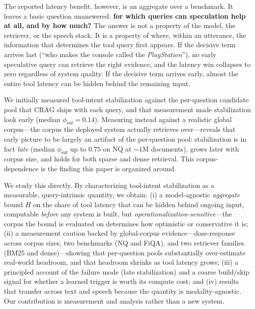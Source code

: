 \documentclass[11pt]{article}
\newcommand{\phiSufMed}{0.14}
\newcommand{\phiSufGnqOneM}{0.75}    %
\begin{document}
The reported latency benefit, however, is an aggregate over a benchmark. It
leaves a basic question unanswered: \textbf{for which queries can speculation
help at all, and by how much?} The answer is not a property of the model, the
retriever, or the speech stack. It is a property of where, within an utterance,
the information that determines the tool query first appears. If the
decisive term arrives last (``who makes the console called the
\emph{PlayStation}''), no early speculative query can retrieve the right evidence,
and the latency win collapses to zero regardless of system quality. If the
decisive term arrives early, almost the entire tool latency can be hidden behind
the remaining input.

We initially measured tool-intent stabilization against the per-question candidate
pool that CRAG ships with each query, and that measurement made stabilization look
early (median $\phi_{\mathrm{suf}}=\phiSufMed$).  Measuring instead against a
realistic global corpus---the corpus the deployed system actually retrieves
over---reveals that early picture to be largely an artifact of the
per-question pool: stabilization is in fact \emph{late} (median $\phi_{\mathrm{suf}}$
up to $\phiSufGnqOneM$ on NQ at ${\sim}1$M documents), grows later with corpus
size, and holds for both sparse and dense retrieval.  This corpus-dependence is
the finding this paper is organized around.

We study this directly. By characterizing tool-intent stabilization as a
measurable, query-intrinsic quantity, we obtain: (i) a model-agnostic
\emph{aggregate} bound $H$ on the share of tool latency that can be hidden behind
ongoing input, computable \emph{before} any system is built, but
\emph{operationalization-sensitive}---the corpus the bound is evaluated on
determines how optimistic or conservative it is; (ii) a measurement caution
backed by global-corpus evidence---dose-response across corpus sizes, two
benchmarks (NQ and FiQA), and two retriever families (BM25 and dense)---showing
that per-question pools substantially over-estimate real-world headroom, and that
headroom shrinks as tool latency grows; (iii) a principled account of the failure
mode (late stabilization) and a coarse build/skip signal for whether a learned
trigger is worth its compute cost; and (iv) results that transfer across text and
speech because the quantity is modality-agnostic.  Our contribution is
measurement and analysis rather than a new system.
\end{document}
